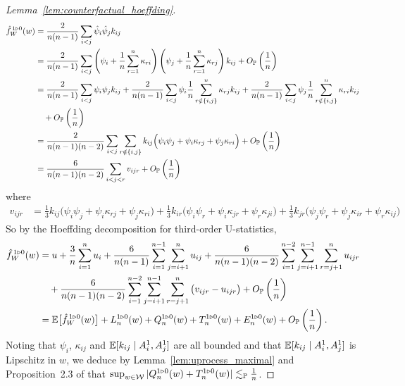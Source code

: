 \begin{proof}[Lemma~\ref{lem:counterfactual_hoeffding}]

  \begin{align*}
    \hat f_W^{\,1 \triangleright 0}(w)
    &=
    \frac{2}{n(n-1)}
    \sum_{i < j}
    \hat \psi_i
    \hat \psi_j
    k_{ij} \\
    &=
    \frac{2}{n(n-1)}
    \sum_{i < j}
    \left(
      \psi_i
      + \frac{1}{n}
      \sum_{r=1}^n \kappa_{r i}
    \right)
    \left(
      \psi_j
      + \frac{1}{n}
      \sum_{r=1}^n \kappa_{r j}
    \right)
    k_{ij}
    + O_\P\left(\frac{1}{n}\right) \\
    &=
    \frac{2}{n(n-1)}
    \sum_{i < j}
    \psi_i
    \psi_j
    k_{ij}
    + \frac{2}{n(n-1)}
    \sum_{i < j}
    \psi_i
    \frac{1}{n}
    \sum_{r \notin \{i,j\}}^n \kappa_{r j}
    k_{ij}
    + \frac{2}{n(n-1)}
    \sum_{i < j}
    \psi_j
    \frac{1}{n}
    \sum_{r \notin \{i,j\}}^n \kappa_{r i}
    k_{ij} \\
    &\quad+
    O_\P\left(\frac{1}{n}\right) \\
    &=
    \frac{2}{n(n-1)(n-2)}
    \sum_{i < j}
    \sum_{r \notin \{i,j\}}
    k_{ij}
    \Big(
    \psi_i
    \psi_j
    +\psi_i
    \kappa_{r j}
    +\psi_j
    \kappa_{r i}
    \Big)
    + O_\P\left(\frac{1}{n}\right) \\
    &=
    \frac{6}{n(n-1)(n-2)}
    \sum_{i < j < r}
    v_{ijr}
    + O_\P\left(\frac{1}{n}\right)
  \end{align*}
  where
  \begin{align*}
    v_{ijr}
    &=
    \frac{1}{3}
    k_{ij} \Big(\psi_i \psi_j +\psi_i \kappa_{r j} +\psi_j \kappa_{r i} \Big)
    + \frac{1}{3}
    k_{ir} \Big(\psi_i \psi_r +\psi_i \kappa_{jr} +\psi_r \kappa_{ji} \Big)
    + \frac{1}{3}
    k_{jr} \Big(\psi_j \psi_r +\psi_j \kappa_{ir} +\psi_r \kappa_{ij} \Big)
  \end{align*}
  So by the Hoeffding decomposition for third-order U-statistics,
  \begin{align*}
    \hat f_W^{\,1 \triangleright 0}(w)
    &=
    u
    + \frac{3}{n}
    \sum_{i=1}^n
    u_i
    + \frac{6}{n(n-1)}
    \sum_{i=1}^{n-1}
    \sum_{j=i+1}^n
    u_{ij}
    + \frac{6}{n(n-1)(n-2)}
    \sum_{i=1}^{n-2}
    \sum_{j=i+1}^{n-1}
    \sum_{r=j+1}^n
    u_{ijr} \\
    &\quad+
    \frac{6}{n(n-1)(n-2)}
    \sum_{i=1}^{n-2}
    \sum_{j=i+1}^{n-1}
    \sum_{r=j+1}^n
    \big(v_{ijr} - u_{ijr}\big)
    + O_\P\left( \frac{1}{n} \right) \\
    &=
    \E\big[\hat f_W^{\,1 \triangleright 0}(w) \big]
    + L_n^{1 \triangleright 0}(w)
    + Q_n^{1 \triangleright 0}(w)
    + T_n^{1 \triangleright 0}(w)
    + E_n^{1 \triangleright 0}(w)
    + O_\P\left( \frac{1}{n} \right).
  \end{align*}
  Noting that $\psi_i$, $\kappa_{ij}$
  and $\E[k_{ij} \mid A_i^1, A_j^1]$
  are all bounded and that
  $\E[k_{ij} \mid A_i^1, A_j^1]$
  is Lipschitz in $w$,
  we deduce by
  Lemma~\ref{lem:uprocess_maximal}
  and Proposition~2.3 of
  \citet{arcones1993limit} that
  $\sup_{w \in \cW} |Q_n^{1 \triangleright 0}(w)
  + T_n^{1 \triangleright 0}(w)| \lesssim_\P \frac 1n$.
\end{proof}

